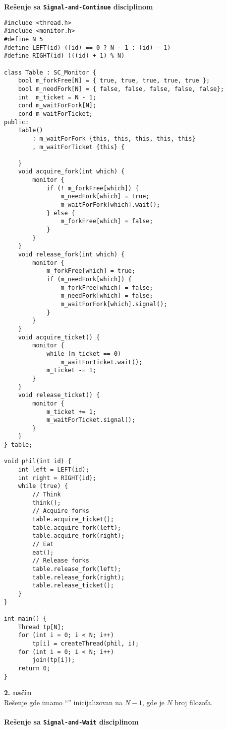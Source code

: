 \textbf{Re\v{s}enje sa \texttt{Signal-and-Continue} disciplinom}
\begin{lstlisting}
#include <thread.h>
#include <monitor.h>
#define N 5
#define LEFT(id) ((id) == 0 ? N - 1 : (id) - 1)
#define RIGHT(id) (((id) + 1) % N)

class Table : SC_Monitor {
    bool m_forkFree[N] = { true, true, true, true, true };
    bool m_needFork[N] = { false, false, false, false, false};
    int  m_ticket = N - 1;
    cond m_waitForFork[N];
    cond m_waitForTicket;
public:
    Table() 
        : m_waitForFork {this, this, this, this, this}
        , m_waitForTicket {this} {
        
    }
    void acquire_fork(int which) {
        monitor {
            if (! m_forkFree[which]) {
                m_needFork[which] = true;
                m_waitForFork[which].wait();
            } else {
                m_forkFree[which] = false;
            }
        }
    }
    void release_fork(int which) {
        monitor {
            m_forkFree[which] = true;
            if (m_needFork[which]) {
                m_forkFree[which] = false;
                m_needFork[which] = false;
                m_waitForFork[which].signal();
            }
        }
    }
    void acquire_ticket() {
        monitor {
            while (m_ticket == 0)
                m_waitForTicket.wait();
            m_ticket -= 1;
        }
    }
    void release_ticket() {
        monitor {
            m_ticket += 1;
            m_waitForTicket.signal();
        }
    }
} table;

void phil(int id) {
    int left = LEFT(id);
    int right = RIGHT(id);
    while (true) {
        // Think
        think();
        // Acquire forks
        table.acquire_ticket();
        table.acquire_fork(left);
        table.acquire_fork(right);
        // Eat
        eat();
        // Release forks
        table.release_fork(left);
        table.release_fork(right);
        table.release_ticket();
    }
}

int main() {
    Thread tp[N];
    for (int i = 0; i < N; i++) 
        tp[i] = createThread(phil, i);
    for (int i = 0; i < N; i++) 
        join(tp[i]);
    return 0;
}

\end{lstlisting}
\clearpage
\textbf{\large 2. na\v{c}in}\\
Re\v{s}enje gde imamo ``'' inicijalizovan na $N-1$, gde je $N$ broj filozofa.
\\\\
\textbf{Re\v{s}enje sa \texttt{Signal-and-Wait} disciplinom}

